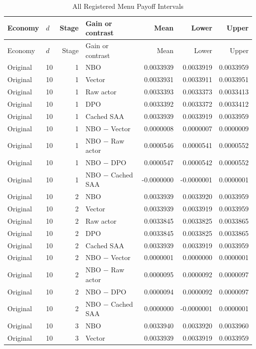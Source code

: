 \begin{longtable}{llrlrrr}
\caption{All Registered Menu Payoff Intervals}\label{tab:r16menuall}\\
\toprule
Economy & $d$ & Stage & Gain or contrast & Mean & Lower & Upper \\
\midrule
\endfirsthead
\toprule
Economy & $d$ & Stage & Gain or contrast & Mean & Lower & Upper \\
\midrule\endhead
Original & 10 & 1 & NBO & 0.0033939 & 0.0033919 & 0.0033959 \\
Original & 10 & 1 & Vector & 0.0033931 & 0.0033911 & 0.0033951 \\
Original & 10 & 1 & Raw actor & 0.0033393 & 0.0033373 & 0.0033413 \\
Original & 10 & 1 & DPO & 0.0033392 & 0.0033372 & 0.0033412 \\
Original & 10 & 1 & Cached SAA & 0.0033939 & 0.0033919 & 0.0033959 \\
Original & 10 & 1 & NBO $-$ Vector & 0.0000008 & 0.0000007 & 0.0000009 \\
Original & 10 & 1 & NBO $-$ Raw actor & 0.0000546 & 0.0000541 & 0.0000552 \\
Original & 10 & 1 & NBO $-$ DPO & 0.0000547 & 0.0000542 & 0.0000552 \\
Original & 10 & 1 & NBO $-$ Cached SAA & -0.0000000 & -0.0000001 & 0.0000001 \\
Original & 10 & 2 & NBO & 0.0033939 & 0.0033920 & 0.0033959 \\
Original & 10 & 2 & Vector & 0.0033939 & 0.0033919 & 0.0033959 \\
Original & 10 & 2 & Raw actor & 0.0033845 & 0.0033825 & 0.0033865 \\
Original & 10 & 2 & DPO & 0.0033845 & 0.0033825 & 0.0033865 \\
Original & 10 & 2 & Cached SAA & 0.0033939 & 0.0033919 & 0.0033959 \\
Original & 10 & 2 & NBO $-$ Vector & 0.0000001 & 0.0000000 & 0.0000001 \\
Original & 10 & 2 & NBO $-$ Raw actor & 0.0000095 & 0.0000092 & 0.0000097 \\
Original & 10 & 2 & NBO $-$ DPO & 0.0000094 & 0.0000092 & 0.0000097 \\
Original & 10 & 2 & NBO $-$ Cached SAA & 0.0000000 & -0.0000001 & 0.0000001 \\
Original & 10 & 3 & NBO & 0.0033940 & 0.0033920 & 0.0033960 \\
Original & 10 & 3 & Vector & 0.0033939 & 0.0033919 & 0.0033959 \\

\end{longtable}
